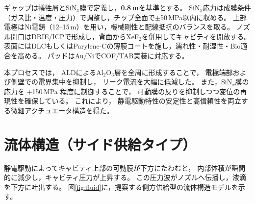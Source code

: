 \documentclass[conference]{IEEEtran}
\begin{document}
ギャップは犠牲層とSiN$_x$膜で定義し，\textbf{0.8\,\textmu m}を基準とする。
SiN$_x$応力は成膜条件（ガス比・温度・圧力）で調整し，チップ全面で$\pm$50\,MPa以内に収める。
上部電極はNi電鋳（12--15\,\textmu m）を用い，機械剛性と配線抵抗のバランスを取る。
ノズル開口はDRIE/ICPで形成し，背面からXeF$_2$を併用してキャビティを開放する。
表面にはDLCもしくはParylene-Cの薄膜コートを施し，濡れ性・耐湿性・Bio適合を高める。
パッドはAu/NiでCOF/TAB実装に対応する。

\begin{table}[t]
\centering
\caption{静電MEMSアクチュエータの代表的製造プロセス（400\,°C以下）}
\label{tab:process}
\end{table}

本プロセスでは，
ALDによるAl$_2$O$_3$層を全周に形成することで，
電極端部および側壁での電界集中を抑制し，
リーク電流を大幅に低減した。
また，SiN$_x$膜の応力を +150\,MPa 程度に制御することで，
可動膜の反りを抑制しつつ変位の再現性を確保している。
これにより，
静電駆動特性の安定性と高信頼性を両立する微細アクチュエータ構造を得た。

\section{流体構造（サイド供給タイプ）}
静電駆動によってキャビティ上部の可動膜が下方にたわむと，
内部体積が瞬間的に減少し，キャビティ圧力が上昇する。
この圧力波がノズルへ伝播し，液滴を下方に吐出する。
図\ref{fig:fluid}に，提案する側方供給型の流体構造モデルを示す。
\end{document}
